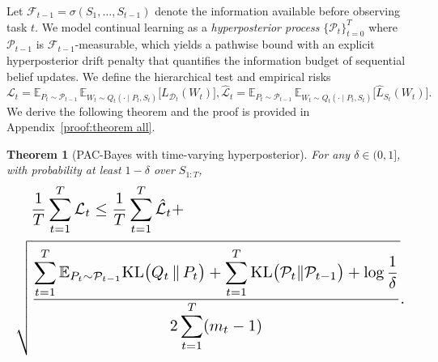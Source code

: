 \documentclass{article}
\theoremstyle{plain}
\newtheorem{theorem}{Theorem}[section]
\theoremstyle{definition}
\theoremstyle{remark}
\begin{document}
Let $\mathcal F_{t-1}=\sigma(S_1,\dots,S_{t-1})$ denote the information available before observing task $t$.
We model continual learning as a \emph{hyperposterior process} $\{\mathcal P_t\}_{t=0}^T$ where $\mathcal P_{t-1}$ is $\mathcal F_{t-1}$-measurable, which yields a pathwise bound with an explicit hyperposterior drift penalty that quantifies the information budget of sequential belief updates. We define the hierarchical test and empirical risks $
\mathcal L_t
=
\mathbb E_{P_t \sim \mathcal{P}_{t-1}}
\,
\mathbb E_{W_t \sim Q_t(\cdot \mid P_t,S_t)}
\big[
L_{\mathcal D_t}(W_t)
\big],
\hat{\mathcal L}_t
=
\mathbb E_{P_t \sim \mathcal{P}_{t-1}}
\,
\mathbb E_{W_t \sim Q_t(\cdot \mid P_t,S_t)}
\big[
\hat L_{S_t}(W_t)
\big].
$
We derive the following theorem and the proof is provided in Appendix~\ref{proof:theorem all}.
\begin{theorem}[PAC-Bayes with time-varying hyperposterior]
\label{thm:pathwise_pac}
For any $\delta\in(0,1]$, with probability at least $1-\delta$ over $S_{1:T}$,
\begin{equation*}
\resizebox{\linewidth}{!}{$
\begin{aligned} 
&\quad\frac{1}{T} \sum_{t=1}^T \mathcal L_t
\le  
\frac{1}{T} \sum_{t=1}^T \hat{\mathcal L}_t  + \\
&
\sqrt{
\frac{
\displaystyle
\sum_{t=1}^T
\mathbb E_{P_t\sim\mathcal P_{t-1}}
\mathrm{KL}\bigl(Q_t \,\Vert\, P_t\bigr)
+
\sum_{t=1}^T
\mathrm{KL}\bigl(\mathcal P_t\Vert\mathcal P_{t-1}\bigr)
+
\log\frac{1}{\delta}}
{2\displaystyle\sum_{t=1}^T (m_t - 1)}
}.
\end{aligned}
$}
\end{equation*}
\end{theorem}
\end{document}
